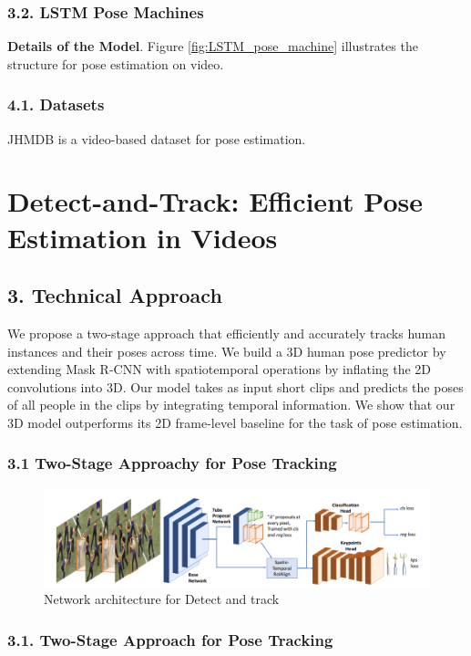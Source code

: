 \documentclass[a4paper]{report}
\begin{document}
\subsection*{3.2. LSTM Pose Machines}
\textbf{Details of the Model}.
Figure \ref{fig:LSTM_pose_machine} illustrates the structure for pose estimation on video.

\subsection*{4.1. Datasets}
JHMDB is a video-based dataset for pose estimation.

\chapter*{Detect-and-Track: Efficient Pose Estimation in Videos}
\section*{3. Technical Approach}
We propose a two-stage approach that efficiently and accurately tracks human instances and their poses across time. We build a 3D human pose predictor by extending Mask R-CNN with spatiotemporal operations by inflating the 2D convolutions into 3D. Our model takes as input short clips and predicts the poses of all people in the clips by integrating temporal information. We show that our 3D model outperforms its 2D frame-level baseline for the task of pose estimation.

\subsection*{3.1 Two-Stage Approachy for Pose Tracking}
\begin{figure}[h]
    \centering
    \includegraphics[width=0.8 \textwidth]{./entities/Detect_and_track.PNG}
    \caption{Network architecture for Detect and track}
    \label{fig:Detect_and_track}
\end{figure}
\subsection*{3.1. Two-Stage Approach for Pose Tracking}
\end{document}
